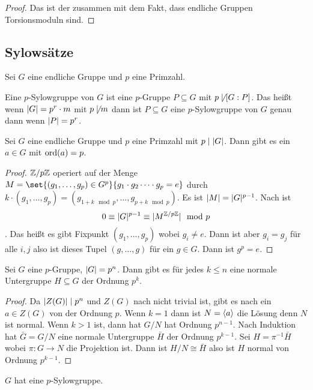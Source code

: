 \begin{proof}
    Das ist der  zusammen mit dem Fakt, dass endliche Gruppen Torsionsmoduln sind.
\end{proof}
\subsection{Sylowsätze}
Sei \(G\) eine endliche Gruppe und \(p\) eine Primzahl.
\begin{Def}
    Eine \(p\)-Sylowgruppe von \(G\) ist eine \(p\)-Gruppe \(P\subseteq G\) mit \(p\not\mid[G:P]\). Das heißt wenn \(\lvert G\rvert=p^r\cdot m\) mit \(p\not\mid m\) dann ist \(P\subseteq G\) eine \(p\)-Sylowgruppe von \(G\) genau dann wenn \(\lvert P\rvert=p^r\).
\end{Def}
\begin{Lemma}\label{Lem:CauchyGrp}
    Sei \(G\) eine endliche Gruppe und \(p\) eine Primzahl mit \(p\mid \lvert G\rvert\). Dann gibt es ein \(a\in G\) mit \(\operatorname{ord}(a)=p\).
\end{Lemma}
\begin{proof}
    \(\mathbb{Z}/p\mathbb{Z}\) operiert auf der Menge \(M=\set{(g_1,\dots,g_p)\in G^p}{g_1\cdot g_2\dots \cdot g_p=e}\) durch \(k\cdot (g_1,\dots,g_p)=(g_{1+k\mod p},\dots,g_{p+k\mod p})\). Es ist \(\lvert M\rvert=\lvert G\rvert ^{p-1}\).
    Nach  ist \[0\equiv \lvert G\rvert^{p-1}\equiv \lvert M^{\mathbb{Z}/p\mathbb{Z}}\rvert\mod p\]. Das heißt es gibt Fixpunkt \((g_1,\dots,g_p)\) wobei \(g_i\neq e\).
    Dann ist aber \(g_i=g_j\) für alle \(i,j\) also ist dieses Tupel \((g,\dots ,g)\) für ein \(g\in G\). Dann ist \(g^p=e\).
\end{proof}
\begin{Kor}\label{Kor:NormIndex}
    Sei \(G\) eine \(p\)-Gruppe, \(\lvert G\rvert=p^n\). Dann gibt es für jedes \(k\leq n\) eine normale Untergruppe \(H\subseteq G\) der Ordnung \(p^k\).
\end{Kor}
\begin{proof}
    Da \(\lvert Z(G)\rvert\mid p^n\) und \(Z(G)\) nach  nicht trivial ist, gibt es nach  ein \(a\in Z(G)\) von der Ordnung \(p\). Wenn \(k=1\) dann ist \(N=\langle a\rangle\) die Lösung denn \(N\) ist normal. Wenn \(k>1\) ist, dann hat \(G/N\) hat Ordnung \(p^{n-1}\). Nach Induktion hat \(\bar G=G/N\) eine normale Untergruppe \(\bar H\) der Ordnung \(p^{k-1}\). Sei \(H=\pi^{-1}\bar H\) wobei \(\pi\colon G\to N\) die Projektion ist. Dann ist \(H/N\cong \bar H\) also ist \(H\) normal von Ordnung \(p^{k-1}\).
\end{proof}
\begin{Satz}[1. Sylowsatz]
    \(G\) hat eine \(p\)-Sylowgruppe.
\end{Satz}
